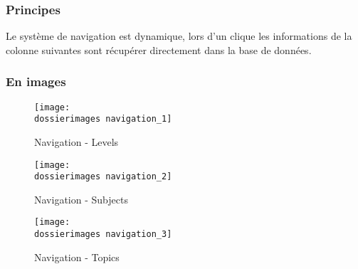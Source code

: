 \subsubsection{Principes}
Le système de navigation est dynamique, lors d'un clique les informations de la colonne suivantes sont récupérer directement dans la base de données.

\subsubsection{En images}
\begin{figure}[H]
	\begin{center}
		\texttt{[image: \\dossierimages navigation\_1]}
	\end{center}
	\caption{Navigation - Levels}
	\label{Navigation - Levels}
\end{figure}
\begin{figure}[H]
	\begin{center}
		\texttt{[image: \\dossierimages navigation\_2]}
	\end{center}
	\caption{Navigation - Subjects}
	\label{Navigation - Subjects}
\end{figure}
\begin{figure}[H]
	\begin{center}
		\texttt{[image: \\dossierimages navigation\_3]}
	\end{center}
	\caption{Navigation - Topics}
	\label{Navigation - Topics}
\end{figure}